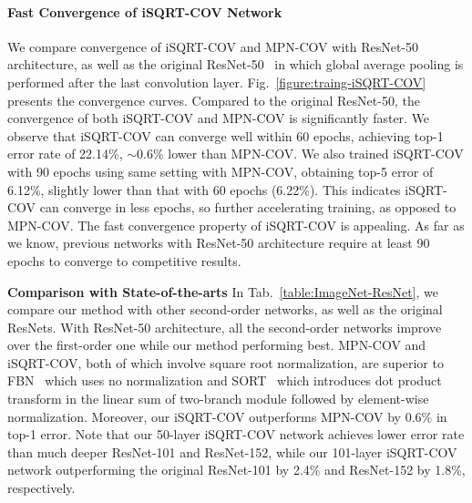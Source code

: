 \documentclass[10pt,twocolumn,letterpaper]{article}
\begin{document}
\vspace{-8pt}\paragraph{Fast Convergence of iSQRT-COV Network}
We compare convergence of iSQRT-COV and MPN-COV with ResNet-50 architecture, as well as the original ResNet-50~\cite{He_2016_CVPR} in which  global average pooling is performed after the last convolution layer. Fig.~\ref{figure:traing-iSQRT-COV} presents the convergence curves. Compared to the original ResNet-50, the convergence of both iSQRT-COV and MPN-COV is significantly faster. We  observe that  iSQRT-COV can converge well within 60 epochs, achieving top-1 error rate of 22.14\%, $\sim$0.6\% lower than MPN-COV. We also trained iSQRT-COV with  90 epochs using  same setting with MPN-COV, obtaining top-5 error of 6.12\%, slightly lower than  that with 60 epochs (6.22\%). This indicates  iSQRT-COV can converge in less epochs, so further accelerating training, as opposed to MPN-COV.   The fast convergence property of iSQRT-COV is appealing. As far as we know, previous networks with ResNet-50 architecture require at least 90 epochs to converge to  competitive results.


\vspace{4pt}\noindent\textbf{Comparison with State-of-the-arts}\quad 
In Tab.~\ref{table:ImageNet-ResNet}, we compare our method with other second-order networks, as well as the original ResNets. With ResNet-50 architecture, all the second-order networks improve over the first-order one while our method performing best. MPN-COV and iSQRT-COV, both of which involve square root normalization, are superior to  FBN~\cite{LiYanghao_2017_ICCV} which uses no normalization and SORT~\cite{Wang_2017_ICCV} which introduces dot product transform in the linear sum of two-branch module followed by element-wise normalization. Moreover, our iSQRT-COV  outperforms MPN-COV by  0.6\% in top-1 error. Note that our 50-layer iSQRT-COV network achieves lower error rate  than much deeper  ResNet-101 and ResNet-152, while our 101-layer iSQRT-COV network outperforming the original ResNet-101 by 2.4\% and ResNet-152 by 1.8\%, respectively.
\end{document}
